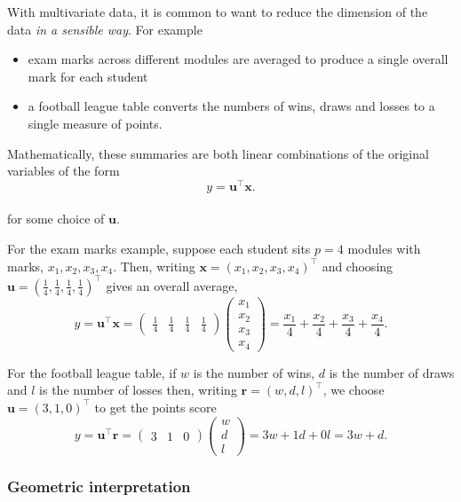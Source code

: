 \documentclass[
]{book}
\theoremstyle{definition}
\theoremstyle{definition}
\theoremstyle{definition}
\theoremstyle{definition}
\theoremstyle{remark}
\begin{document}
With multivariate data, it is common to want to reduce the dimension of the data \emph{in a sensible way}. For example

\begin{itemize}
\item
  exam marks across different modules are
  averaged to produce a single overall mark for each
  student
\item
  a football league table converts the
  numbers of wins, draws and losses to a single measure of
  points.
\end{itemize}

Mathematically, these summaries
are both linear combinations of the
original variables of the form
\[y = \mathbf u^\top \mathbf x.\]\\
for some choice of \(\mathbf u\).

For the exam marks example, suppose each student sits \(p=4\) modules
with marks, \(x_1,x_2,x_3,x_4\). Then, writing \(\mathbf x=(x_1, x_2 , x_3, x_4)^\top\) and choosing \(\mathbf u= \left(\frac{1}{4}, \frac{1}{4}, \frac{1}{4}, \frac{1}{4} \right)^\top\)
gives an overall average,
\[ y =\mathbf u^\top \mathbf x= \begin{pmatrix} \frac{1}{4} & \frac{1}{4} & \frac{1}{4} & \frac{1}{4} \end{pmatrix} \begin{pmatrix} x_1 \\ x_2 \\ x_3 \\ x_4 \end{pmatrix} = \frac{x_1}{4} + \frac{x_2}{4} + \frac{x_3}{4} + \frac{x_4}{4}.\]

For the football league table, if \(w\) is the number of wins, \(d\) is the number of draws and \(l\) is the number of losses then, writing
\({\mathbf r}=(w,d,l)^\top\), we choose \(\mathbf u= \left(3,1,0 \right)^\top\) to get the points score
\[ y = \mathbf u^\top {\mathbf r}=\begin{pmatrix} 3 & 1 & 0 \end{pmatrix} \begin{pmatrix} w \\ d \\ l \end{pmatrix} = 3w + 1d + 0l=3w+d.\]

\subsubsection*{Geometric interpretation}\label{geometric-interpretation}
\end{document}
